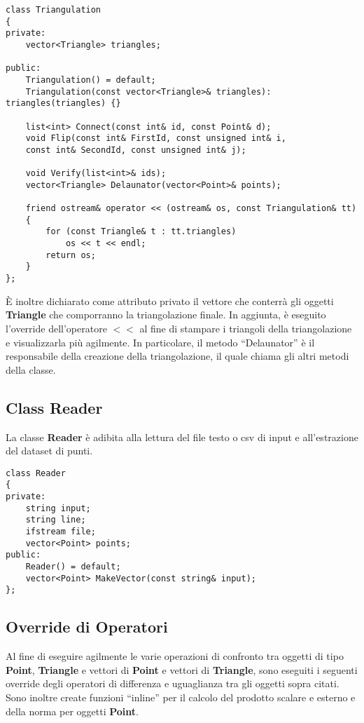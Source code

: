 \documentclass{article}
\begin{document}
\begin{lstlisting}
class Triangulation
{
private:
    vector<Triangle> triangles;

public:
    Triangulation() = default;
    Triangulation(const vector<Triangle>& triangles): triangles(triangles) {}

    list<int> Connect(const int& id, const Point& d);
    void Flip(const int& FirstId, const unsigned int& i,  
    const int& SecondId, const unsigned int& j);
    
    void Verify(list<int>& ids);
    vector<Triangle> Delaunator(vector<Point>& points);

    friend ostream& operator << (ostream& os, const Triangulation& tt)
    {
        for (const Triangle& t : tt.triangles)
            os << t << endl;
        return os;
    }
};
\end{lstlisting}
È inoltre dichiarato come attributo privato il vettore che conterrà gli oggetti \textbf{Triangle} che comporranno la triangolazione finale.
In aggiunta,  è eseguito l'override dell'operatore $<<$ al fine di stampare i triangoli della triangolazione e visualizzarla più agilmente. 
In particolare,  il metodo \enquote{Delaunator} è il responsabile della creazione della triangolazione,  il quale chiama gli altri metodi della classe.
\newpage
\subsection{Class Reader}
La classe \textbf{Reader} è adibita alla lettura del file testo o csv di input e all'estrazione del dataset di punti.

\begin{lstlisting}
class Reader
{
private:
    string input;
    string line;
    ifstream file;
    vector<Point> points;
public:
    Reader() = default;
    vector<Point> MakeVector(const string& input);
};
\end{lstlisting}

\subsection{Override di Operatori}
Al fine di eseguire agilmente le varie operazioni di confronto tra oggetti di tipo \textbf{Point}, \textbf{Triangle} e vettori di \textbf{Point} e vettori di \textbf{Triangle},  sono eseguiti i seguenti override degli operatori di differenza e uguaglianza tra gli oggetti sopra citati.  Sono inoltre create funzioni \enquote{inline} per il calcolo del prodotto scalare e esterno e della norma per oggetti \textbf{Point}.
\end{document}
